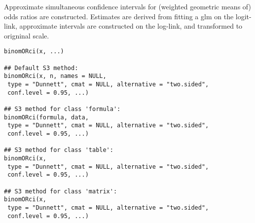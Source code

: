 \begin{Description}\relax
Approximate simultaneous confidence intervals for (weighted geometric means of) odds ratios
are constructed. Estimates are derived from fitting a glm on the logit-link,
approximate intervals are constructed on the log-link,
and transformed to origninal scale.
\end{Description}
\begin{Usage}
\begin{verbatim}
binomORci(x, ...)

## Default S3 method:
binomORci(x, n, names = NULL,
 type = "Dunnett", cmat = NULL, alternative = "two.sided",
 conf.level = 0.95, ...)

## S3 method for class 'formula':
binomORci(formula, data,
 type = "Dunnett", cmat = NULL, alternative = "two.sided",
 conf.level = 0.95, ...)

## S3 method for class 'table':
binomORci(x,
 type = "Dunnett", cmat = NULL, alternative = "two.sided",
 conf.level = 0.95, ...)

## S3 method for class 'matrix':
binomORci(x,
 type = "Dunnett", cmat = NULL, alternative = "two.sided",
 conf.level = 0.95, ...)
\end{verbatim}
\end{Usage}
